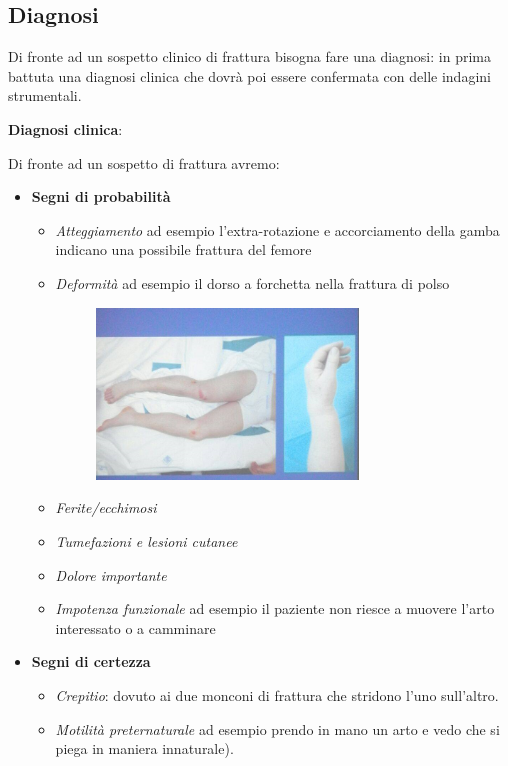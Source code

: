 \subsection{Diagnosi}

Di fronte ad un sospetto clinico di frattura bisogna fare una diagnosi: in prima battuta una diagnosi clinica che dovrà poi essere confermata con delle indagini strumentali.

\textbf{Diagnosi clinica}:

Di fronte ad un sospetto di frattura avremo:

\begin{itemize}
\item
  \textbf{Segni di probabilità}

\begin{itemize}
\item
  \emph{Atteggiamento} ad esempio l'extra-rotazione e accorciamento della gamba indicano una possibile frattura del femore
\item
  \emph{Deformità} ad esempio il dorso a forchetta nella frattura di polso

\begin{figure}[!ht]
\centering
\includegraphics[width=0.7\textwidth]{002/image13.png}
\end{figure}

\item
  \emph{Ferite/ecchimosi}
\item
  \emph{Tumefazioni e lesioni cutanee}
\item
  \emph{Dolore importante}
\item
  \emph{Impotenza funzionale} ad esempio il paziente non riesce a muovere l'arto interessato o a camminare
\end{itemize}

\item
  \textbf{Segni di certezza }

\begin{itemize}
\item
  \emph{Crepitio}: dovuto ai due monconi di frattura che stridono l'uno sull'altro.
\item
  \emph{Motilità preternaturale} ad esempio prendo in mano un arto e vedo che si piega in maniera innaturale).
\end{itemize}
\end{itemize}

